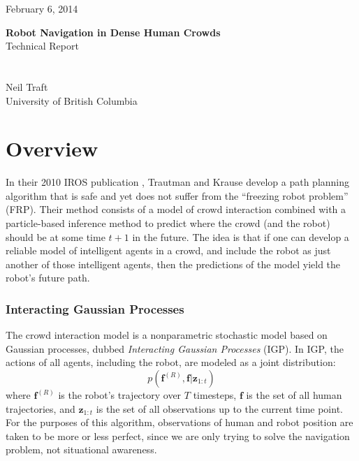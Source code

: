 \documentclass[a4paper,11pt,headings=small]{article}
\begin{document}
  \vspace{-1cm}
	\begin{flushright}
	February 6, 2014\\
	\end{flushright}
	\vspace{0.6cm}
	\LARGE{\textbf{Robot Navigation in Dense Human Crowds}\\[0.2cm] Technical Report}\\\\ \\
	\large{Neil Traft\\[0.1cm] University of British Columbia}		 	 	\vspace{0.6cm}


\pagestyle{fancy}
\fancyhf{}

\setcounter{page}{1}

\renewcommand{\thesection}{\Roman{section}}
\thispagestyle{empty}

\newcommand{\f}{\mathbf{f}}
\newcommand{\fr}{\f^{(R)}}
\newcommand{\fati}{\f^{(i)}}
\newcommand{\fatj}{\f^{(j)}}
\newcommand{\samplej}{(\fatj)_i}
\newcommand{\z}{\mathbf{z}}
\newcommand{\ztot}{\z_{1:t}}
\newcommand{\pos}{\mathrm{pos}}
\newcommand{\post}{\pos^{(i)}_t}

\section*{Overview}
\quad In their 2010 IROS publication \cite{Trautman2010}, Trautman and Krause develop a path planning algorithm that is safe and yet does not suffer from the ``freezing robot problem'' (FRP). Their method consists of a model of crowd interaction combined with a particle-based inference method to predict where the crowd (and the robot) should be at some time $t+1$ in the future. The idea is that if one can develop a reliable model of intelligent agents in a crowd, and include the robot as just another of those intelligent agents, then the predictions of the model yield the robot's future path.

\subsubsection*{Interacting Gaussian Processes}
\quad The crowd interaction model is a nonparametric stochastic model based on Gaussian processes, dubbed \emph{Interacting Gaussian Processes} (IGP). In IGP, the actions of all agents, including the robot, are modeled as a joint distribution:
$$p(\fr,\f|\ztot)$$
where $\fr$ is the robot's trajectory over $T$ timesteps, $\f$ is the set of all human trajectories, and $\ztot$ is the set of all observations up to the current time point. For the purposes of this algorithm, observations of human and robot position are taken to be more or less perfect, since we are only trying to solve the navigation problem, not situational awareness.
\end{document}

